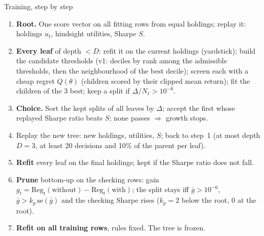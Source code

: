 \documentclass[10pt,aspectratio=169]{beamer}
\newcommand{\1}{\mathbf{1}}
\newcommand{\Reg}{\mathrm{Reg}}
\begin{document}
\begin{frame}{Training, step by step}
\begin{center}
\end{center}
\footnotesize
\begin{enumerate}
\item[0.] \textbf{Root.} One score vector on all fitting rows from equal holdings; replay it: holdings $u_t$, hindsight utilities, Sharpe $S$.
\item[1.] \textbf{Every leaf} of depth $<D$: refit it on the current holdings (yardstick); build the candidate thresholds (v1: deciles by rank among the admissible thresholds, then the neighbourhood of the best decile); screen each with a cheap regret $Q(\theta)$ (children scored by their clipped mean return); fit the children of the 3 best; keep a split if $\Delta/N_\ell>10^{-6}$.
\item[2.] \textbf{Choice.} Sort the kept splits of all leaves by $\Delta$; accept the first whose replayed Sharpe ratio beats $S$; none passes $\Rightarrow$ growth stops.
\item[3.] Replay the new tree: new holdings, utilities, $S$; back to step~1 (at most depth $D=3$, at least 20 decisions and 10\% of the parent per leaf).
\item[4.] \textbf{Refit} every leaf on the final holdings; kept if the Sharpe ratio does not fall.
\item[5.] \textbf{Prune} bottom-up on the checking rows: gain $g_t=\Reg_t(\text{without})-\Reg_t(\text{with})$; the split stays iff $\bar g>10^{-6}$, $\bar g>k_p\,\mathrm{se}(\bar g)$ and the checking Sharpe rises ($k_p=2$ below the root, $0$ at the root).
\item[6.] \textbf{Refit on all training rows}, rules fixed. The tree is frozen.
\end{enumerate}
\end{frame}
\end{document}
